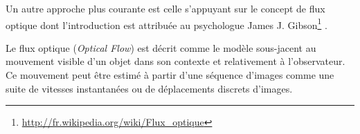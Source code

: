 \documentclass[a4paper,12pt]{report}
\begin{document}
	
	
	Un autre approche plus courante est celle s'appuyant sur le concept de flux optique dont l'introduction est attribuée au psychologue James J. Gibson\footnote{\url{http://fr.wikipedia.org/wiki/Flux_optique}} . 
	
	Le flux optique (\textit{Optical Flow}) est décrit comme le modèle sous-jacent au mouvement visible d'un objet dans son contexte et relativement à l'observateur. Ce mouvement peut être estimé à partir d'une séquence d'images comme une suite de vitesses instantanées ou de déplacements discrets d'images.\\ 
	
	
\end{document}
